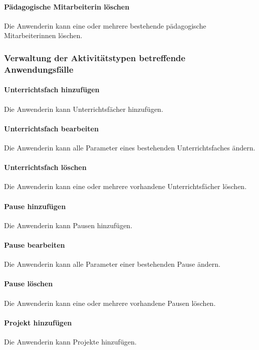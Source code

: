 \documentclass[fontsize=12pt,paper=a4,twoside]{scrartcl}
\begin{document}
\paragraph{Pädagogische Mitarbeiterin löschen}
Die Anwenderin kann eine oder mehrere bestehende pädagogische Mitarbeiterinnen löschen.

\subsubsection{Verwaltung der Aktivitätstypen betreffende Anwendungsfälle}

\paragraph{Unterrichtsfach hinzufügen}
Die Anwenderin kann Unterrichtsfächer hinzufügen.

\paragraph{Unterrichtsfach bearbeiten}
Die Anwenderin kann alle Parameter eines bestehenden Unterrichtsfaches ändern.

\paragraph{Unterrichtsfach löschen}
Die Anwenderin kann eine oder mehrere vorhandene Unterrichtsfächer löschen.

\paragraph{Pause hinzufügen}
Die Anwenderin kann Pausen hinzufügen.

\paragraph{Pause bearbeiten}
Die Anwenderin kann alle Parameter einer bestehenden Pause ändern.

\paragraph{Pause löschen}
Die Anwenderin kann eine oder mehrere vorhandene Pausen löschen.

\paragraph{Projekt hinzufügen}
Die Anwenderin kann Projekte hinzufügen.
\end{document}
